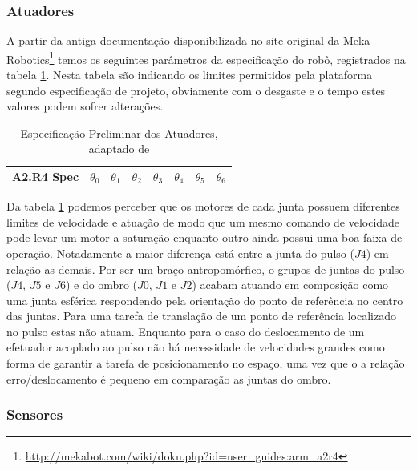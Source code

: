 \subsubsection{Atuadores}

A partir da antiga documentação disponibilizada no site original da Meka Robotics\footnote{\url{http://mekabot.com/wiki/doku.php?id=user_guides:arm_a2r4}} temos os seguintes parâmetros da especificação do robô, registrados na tabela \ref{tab:a2armActuationDoc}. Nesta tabela são indicando os limites permitidos pela plataforma segundo especificação de projeto, obviamente com o desgaste e o tempo estes valores podem sofrer alterações.

\begin{table}[H]
    \centering
    \caption{Especificação Preliminar dos Atuadores, adaptado de \cite{mekaguide}}
    \begin{tabular}{c|ccccccc}
         \hline
         A2.R4 Spec & $\theta_0$ & $\theta_1$ & $\theta_2$ & $\theta_3$ & $\theta_4$ & $\theta_5$ & $\theta_6$\\
         \hline
         
         \hline
    \end{tabular}
    \label{tab:a2armActuationDoc}
\end{table}

Da tabela \ref{tab:a2armActuationDoc} podemos perceber que os motores de cada junta possuem diferentes limites de velocidade e atuação de modo que um mesmo comando de velocidade pode levar um motor a saturação enquanto outro ainda possui uma boa faixa de operação. Notadamente a maior diferença está entre a junta do pulso ($J4$) em relação as demais. Por ser um braço antropomórfico, o grupos de juntas do pulso ($J4$, $J5$ e $J6$) e do ombro ($J0$, $J1$ e $J2$) acabam atuando em composição como uma junta esférica respondendo pela orientação do ponto de referência no centro das juntas. Para uma tarefa de translação de um ponto de referência localizado no pulso estas não atuam. Enquanto para o caso do deslocamento de um efetuador acoplado ao pulso não há necessidade de velocidades grandes como forma de garantir a tarefa de posicionamento no espaço, uma vez que o a relação erro/deslocamento é pequeno em comparação as juntas do ombro.


\subsubsection{Sensores}

